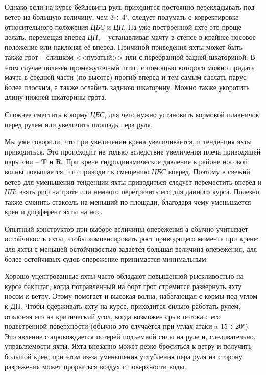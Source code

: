\documentclass[a4paper, 12pt, twoside, final, book, russian, fittopage, cyremdash]{ncc}
\newcommand{\ve}[1]{\ensuremath{\mathbf{#1}}\xspace}
\newcommand{\gr}{\ensuremath{^\circ}\xspace}
\newcommand{\otdo}{\,\ensuremath{\div}\,}
\begin{document}
Однако если на курсе бейдевинд руль приходится постоянно перекладывать под ветер на большую величину, чем 3\otdo 4\gr, следует подумать о корректировке относительного положения \textit{ЦБС} и \textit{ЦП}. На уже построенной яхте это проще делать, перемещая вперед \textit{ЦП}, \--- устанавливая мачту в степсе в крайнее носовое положение или наклоняя её вперед. Причиной приведения яхты может быть также грот \--- слишком <<пузатый>> или с перебранной задней шкаториной. В этом случае полезен промежуточный штаг, с помощью которого можно придать мачте в средней части (по высоте) прогиб вперед и тем самым сделать парус более плоским, а также ослабить заднюю шкаторину. Можно также укоротить длину нижней шкаторины грота. 

Сложнее сместить в корму \textit{ЦБС}, для чего нужно установить кормовой плавничок перед рулем или увеличить площадь пера руля.

Мы уже говорили, что при увеличении крена увеличивается, и тенденция яхты приводиться. Это происходит не только вследствие увеличения плеча приводящей пары сил \--- \ve T и \ve R. При крене гидродинамическое давление в районе носовой волны повышается, что приводит к смещению \textit{ЦБС} вперед. Поэтому в свежий ветер для уменьшения тенденции яхты приводиться следует переместить вперед и \textit{ЦП}: взять риф на гроте или немного перетравить его для данного курса. Полезно также сменить стаксель на меньший по площади, благодаря чему уменьшается крен и дифферент яхты на нос.

Опытный конструктор при выборе величины опережения а обычно учитывает остойчивость яхты, чтобы компенсировать рост приводящего момента при крене: для яхты с меньшей остойчивостью задается большая величина опережения, для более остойчивых судов опережение принимается минимальным.

Хорошо уцентрованные яхты часто обладают повышенной рыскливостью на курсе бакштаг, когда потравленный на борт грот стремится развернуть яхту носом к ветру. Этому помогает и высокая волна, набегающая с кормы под углом к ДП. Чтобы одерживать яхту на курсе, приходится сильно работать рулем, отклоняя его на критический угол, когда возможен срыв потока с его подветренной поверхности (обычно это случается при углах атаки a 15\otdo 20\gr). Это явление сопровождается потерей подъемной силы на руле и, следовательно, управляемости яхты. Яхта внезапно может резко броситься к ветру и получить большой крен, при этом из-за уменьшения углубления пера руля на сторону разрежения может прорваться воздух с поверхности воды. 
\end{document}
